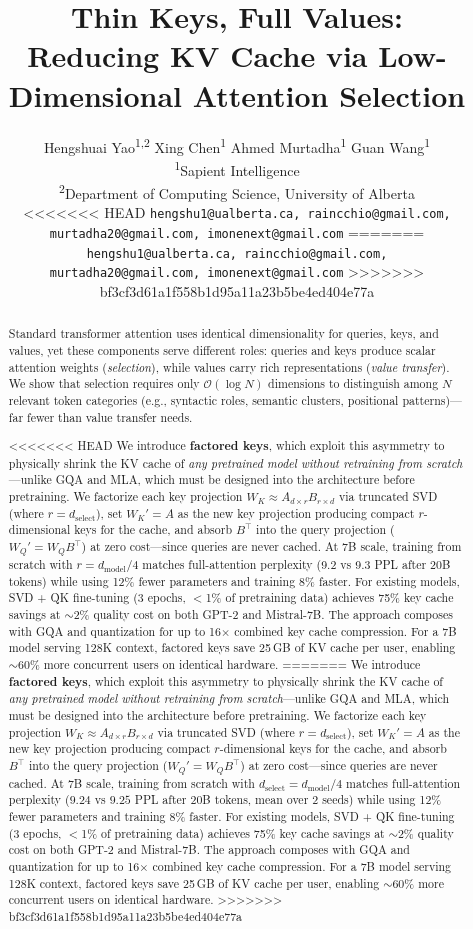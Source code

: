 \documentclass[11pt]{article}
\title{Thin Keys, Full Values: \\
Reducing KV Cache via Low-Dimensional Attention Selection}
\author{%
  Hengshuai Yao\textsuperscript{1,2} \quad Xing Chen\textsuperscript{1} \quad Ahmed Murtadha\textsuperscript{1} \quad Guan Wang\textsuperscript{1} \\
  \textsuperscript{1}Sapient Intelligence \\
  \textsuperscript{2}Department of Computing Science, University of Alberta \\
<<<<<<< HEAD
  \texttt{hengshu1@ualberta.ca, raincchio@gmail.com, murtadha20@gmail.com, imonenext@gmail.com}%
=======
  \texttt{hengshu1@ualberta.ca, raincchio@gmail.com,} \\
  \texttt{murtadha20@gmail.com, imonenext@gmail.com}%
>>>>>>> bf3cf3d61a1f558b1d95a11a23b5be4ed404e77a
}
\newcommand{\dmodel}{d_{\text{model}}}
\newcommand{\dselect}{d_{\text{select}}}
\newcommand{\BigO}{\mathcal{O}}
\begin{document}
\maketitle

\begin{abstract}
Standard transformer attention uses identical dimensionality for queries, keys, and values, yet these components serve different roles: queries and keys produce scalar attention weights (\emph{selection}), while values carry rich representations (\emph{value transfer}). We show that selection requires only $\BigO(\log N)$ dimensions to distinguish among $N$ relevant token categories (e.g., syntactic roles, semantic clusters, positional patterns)---far fewer than value transfer needs.

<<<<<<< HEAD
We introduce \textbf{factored keys}, which exploit this asymmetry to physically shrink the KV cache of \emph{any pretrained model without retraining from scratch}---unlike GQA and MLA, which must be designed into the architecture before pretraining. We factorize each key projection $W_K \approx A_{d \times r} B_{r \times d}$ via truncated SVD (where $r = \dselect$), set $W_K' = A$ as the new key projection producing compact $r$-dimensional keys for the cache, and absorb $B^\top$ into the query projection ($W_Q' = W_Q B^\top$) at zero cost---since queries are never cached. At 7B scale, training from scratch with $r = \dmodel/4$ matches full-attention perplexity (9.2 vs 9.3 PPL after 20B tokens) while using 12\% fewer parameters and training 8\% faster. For existing models, SVD + QK fine-tuning (3 epochs, $<$1\% of pretraining data) achieves 75\% key cache savings at $\sim$2\% quality cost on both GPT-2 and Mistral-7B. The approach composes with GQA and quantization for up to 16$\times$ combined key cache compression. For a 7B model serving 128K context, factored keys save 25\,GB of KV cache per user, enabling $\sim$60\% more concurrent users on identical hardware.
=======
We introduce \textbf{factored keys}, which exploit this asymmetry to physically shrink the KV cache of \emph{any pretrained model without retraining from scratch}---unlike GQA and MLA, which must be designed into the architecture before pretraining. We factorize each key projection $W_K \approx A_{d \times r} B_{r \times d}$ via truncated SVD (where $r = \dselect$), set $W_K' = A$ as the new key projection producing compact $r$-dimensional keys for the cache, and absorb $B^\top$ into the query projection ($W_Q' = W_Q B^\top$) at zero cost---since queries are never cached. At 7B scale, training from scratch with $\dselect = \dmodel/4$ matches full-attention perplexity ($9.24$ vs $9.25$ PPL after 20B tokens, mean over 2 seeds) while using 12\% fewer parameters and training 8\% faster. For existing models, SVD + QK fine-tuning (3 epochs, $<$1\% of pretraining data) achieves 75\% key cache savings at $\sim$2\% quality cost on both GPT-2 and Mistral-7B. The approach composes with GQA and quantization for up to 16$\times$ combined key cache compression. For a 7B model serving 128K context, factored keys save 25\,GB of KV cache per user, enabling $\sim$60\% more concurrent users on identical hardware.
>>>>>>> bf3cf3d61a1f558b1d95a11a23b5be4ed404e77a
\end{abstract}
\end{document}

